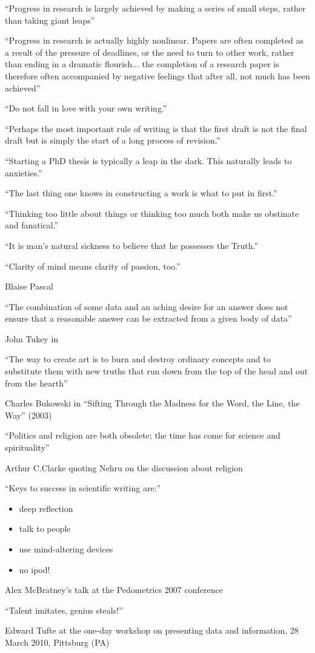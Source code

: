 ``Progress in research is largely achieved by making a series of small steps, rather than taking giant leaps''

``Progress in research is actually highly nonlinear. Papers are often completed as a result of the pressure of deadlines, or the need to turn to other work, rather than ending in a dramatic flourish$\ldots$ the completion of a research paper is therefore often accompanied by negative feelings that after all, not much has been achieved''

``Do not fall in love with your own writing.''

``Perhaps the most important rule of writing is that the first draft is not the final draft but is simply the start of a long process of revision.''

``Starting a PhD thesis is typically a leap in the dark. This naturally leads to anxieties.''


``The last thing one knows in constructing a work is what to put in first.''

``Thinking too little about things or thinking too much both make us obstinate and fanatical.''

``It is man's natural sickness to believe that he possesses the Truth.''

``Clarity of mind means clarity of passion, too.''

Blaise Pascal


``The combination of some data and an aching desire for an answer does not ensure that a reasonable answer can be extracted from a given body of data''

John Tukey in


``The way to create art is to burn and destroy ordinary concepts and to substitute them with new truths that run down from the top of the head and out from the hearth''

Charles Bukowski in ``Sifting Through the Madness for the Word, the Line, the Way'' (2003)


``Politics and religion are both obsolete; the time has come for science and spirituality''

Arthur C.\@ Clarke quoting Nehru on the discussion about religion


``Keys to success in scientific writing are:''
\begin{itemize}
  \item deep reflection
  \item talk to people
  \item use mind-altering devices
  \item no ipod!
\end{itemize}

Alex McBratney's talk at the Pedometrics 2007 conference


``Talent imitates, genius steals!''

Edward Tufte at the one-day workshop on presenting data and information, 28 March 2010, Pittsburg (PA)



